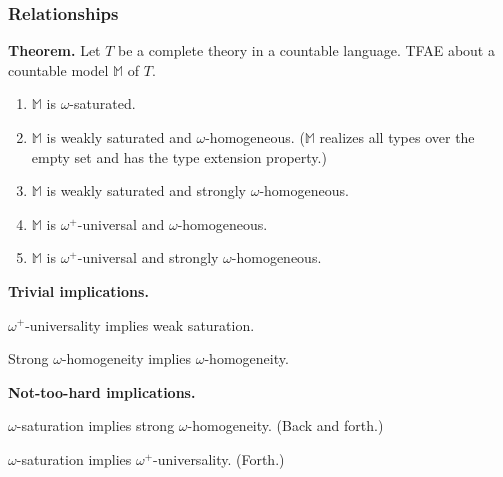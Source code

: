 \documentclass[t,xcolor=dvipsnames,handout]{beamer}
\theoremstyle{theoremFermat}
\theoremstyle{reimann}
\theoremstyle{ACExample}
\begin{document}
\begin{frame} 
  \frametitle{Relationships}

\pause
\noindent
    {\bf Theorem.} Let $T$ be a complete theory in a countable language.
    TFAE about a countable model $\mathbb M$ of $T$. \pause
\begin{enumerate}
\item $\mathbb M$ is $\omega$-saturated. \pause
\item $\mathbb M$ is weakly saturated and $\omega$-homogeneous.
  ($\mathbb M$ realizes all types over the empty set
  and has the type extension property.) \pause
\item $\mathbb M$ is weakly saturated and strongly
  $\omega$-homogeneous. \pause
\item $\mathbb M$ is $\omega^+$-universal and $\omega$-homogeneous. \pause
\item $\mathbb M$ is $\omega^+$-universal and
  strongly $\omega$-homogeneous. \pause
\end{enumerate}

\medskip
\pause
\noindent
{\bf Trivial implications.} \pause

$\omega^+$-universality implies weak saturation.  \pause

Strong $\omega$-homogeneity implies $\omega$-homogeneity. \pause

\medskip
\pause
\noindent
{\bf Not-too-hard implications.} \pause

$\omega$-saturation implies strong $\omega$-homogeneity. \pause
(Back and forth.) \pause

$\omega$-saturation implies $\omega^+$-universality.  \pause
(Forth.) \pause

\end{frame}
\end{document}
